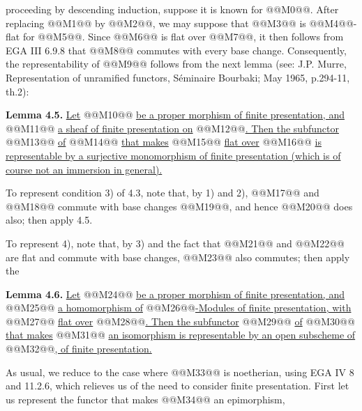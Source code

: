 proceeding by descending induction, suppose it is known for @@M0@@. After replacing @@M1@@ by @@M2@@, we may suppose that @@M3@@ is @@M4@@-flat for @@M5@@. Since @@M6@@ is flat over @@M7@@, it then follows from EGA III 6.9.8 that @@M8@@ commutes with every base change. Consequently, the representability of @@M9@@ follows from the next lemma (see: J.P. Murre, Representation of unramified functors, Séminaire Bourbaki; May 1965, p.294-11, th.2):

\textbf{Lemma 4.5.} \uline{Let} @@M10@@ \uline{be a proper morphism of finite presentation, and} @@M11@@ \uline{a sheaf of finite presentation on} @@M12@@\uline{. Then the subfunctor} @@M13@@ \uline{of} @@M14@@ \uline{that makes} @@M15@@ \uline{flat over} @@M16@@ \uline{is representable by a surjective monomorphism of finite presentation (which is of course not an immersion in general).}

To represent condition 3) of 4.3, note that, by 1) and 2), @@M17@@ and @@M18@@ commute with base changes @@M19@@, and hence @@M20@@ does also; then apply 4.5.

To represent 4), note that, by 3) and the fact that @@M21@@ and @@M22@@ are flat and commute with base changes, @@M23@@ also commutes; then apply the

\textbf{Lemma 4.6.} \uline{Let} @@M24@@ \uline{be a proper morphism of finite presentation, and} @@M25@@ \uline{a homomorphism of} @@M26@@\uline{-Modules of finite presentation, with} @@M27@@ \uline{flat over} @@M28@@\uline{. Then the subfunctor} @@M29@@ \uline{of} @@M30@@ \uline{that makes} @@M31@@ \uline{an isomorphism is representable by an open subscheme of} @@M32@@\uline{, of finite presentation.}

As usual, we reduce to the case where @@M33@@ is noetherian, using EGA IV 8 and 11.2.6, which relieves us of the need to consider finite presentation. First let us represent the functor that makes @@M34@@ an epimorphism,

